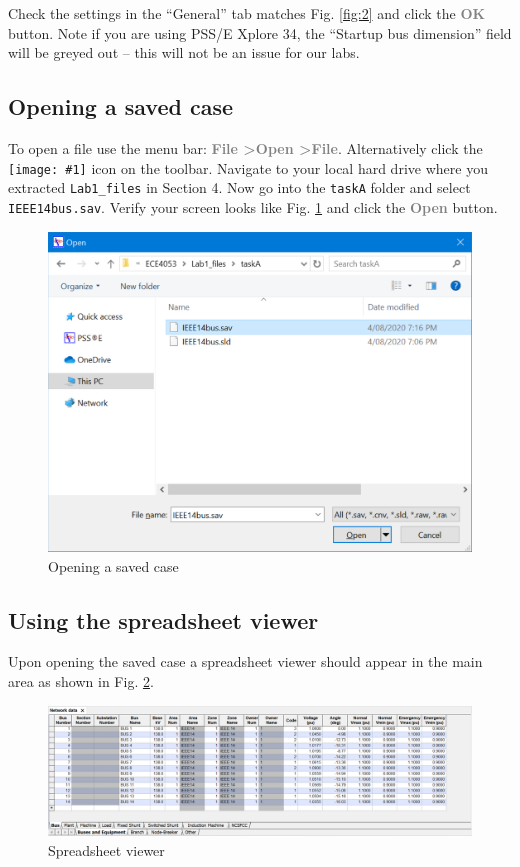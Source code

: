 \documentclass[paper=a4, fontsize=11pt]{article}
\newcommand{\mychar}[1]{%
  \begingroup\normalfont
  \texttt{[image: \#1]}%
  \endgroup
}
\begin{document}
Check the settings in the ``General'' tab matches Fig. \ref{fig:2} and click the \textbf{\textcolor{gray}{OK}} button. Note if you are using PSS/E Xplore 34, the ``Startup bus dimension'' field will be greyed out -- this will not be an issue for our labs.


\subsection{Opening a saved case}
To open a file use the menu bar: \textbf{\textcolor{gray}{File \textgreater \phantom{ }Open \textgreater \phantom{ }File}}. Alternatively click the \mychar{open.png} icon on the toolbar. Navigate to your local hard drive where you extracted \texttt{Lab1\_files} in Section 4. Now go into the \texttt{taskA} folder and select \texttt{IEEE14bus.sav}. Verify your screen looks like Fig. \ref{fig:3} and click the \textbf{\textcolor{gray}{Open}} button.

\begin{figure}[h]
\centering
\includegraphics[scale=0.32]{fig3_opensav.pdf}
\caption{Opening a saved case}
\label{fig:3}
\end{figure}

\newpage
\subsection{Using the spreadsheet viewer}
Upon opening the saved case a spreadsheet viewer should appear in the main area as shown in Fig. \ref{fig:4}. 

\begin{figure}[h]
\centering
\includegraphics[scale=0.32]{fig4_spreadsheet.pdf}
\caption{Spreadsheet viewer}
\label{fig:4}
\end{figure}
\end{document}

